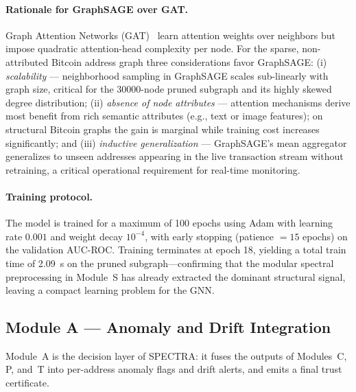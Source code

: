 \paragraph{Rationale for GraphSAGE over GAT.}
Graph Attention Networks (GAT)~\cite{velivckovic2018graph} learn attention
weights over neighbors but impose quadratic attention-head complexity per
node.
For the sparse, non-attributed Bitcoin address graph three considerations
favor GraphSAGE: (i) \emph{scalability} — neighborhood sampling in GraphSAGE
scales sub-linearly with graph size, critical for the \num{30000}-node pruned
subgraph and its highly skewed degree distribution; (ii) \emph{absence of
node attributes} — attention mechanisms derive most benefit from rich semantic
attributes (e.g., text or image features); on structural Bitcoin graphs the
gain is marginal while training cost increases significantly; and (iii)
\emph{inductive generalization} — GraphSAGE's mean aggregator generalizes to
unseen addresses appearing in the live transaction stream without retraining,
a critical operational requirement for real-time monitoring.

\paragraph{Training protocol.}
The model is trained for a maximum of 100 epochs using Adam with learning
rate $0.001$ and weight decay $10^{-4}$, with early stopping
(patience $= 15$ epochs) on the validation AUC-ROC.
Training terminates at epoch 18, yielding a total train time of
\SI{2.09}{\second} on the pruned subgraph—confirming that the modular
spectral preprocessing in Module~S has already extracted the dominant
structural signal, leaving a compact learning problem for the GNN.

\subsection{Module A — Anomaly and Drift Integration}
\label{sec:module_a}

Module~A is the decision layer of \textsc{SPECTRA}: it fuses the outputs of
Modules~C, P, and~T into per-address anomaly flags and drift alerts,
and emits a final trust certificate.

